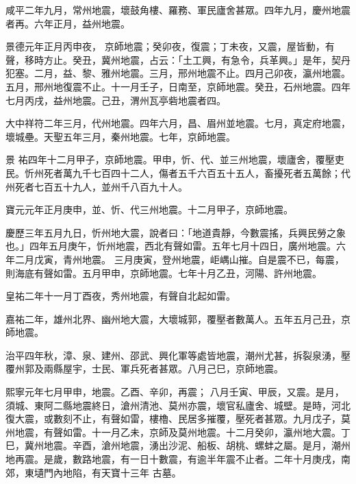 \begin{pinyinscope}
 咸平二年九月，常州地震，壞鼓角樓、羅務、軍民廬舍甚眾。四年九月，慶州地震者再。六年正月，益州地震。



 景德元年正月丙申夜，
 京師地震；癸卯夜，復震；丁未夜，又震，屋皆動，有聲，移時方止。癸丑，冀州地震，占云：「土工興，有急令，兵革興。」是年，契丹犯塞。二月，益、黎、雅州地震。三月，邢州地震不止。四月己卯夜，瀛州地震。五月，邢州地復震不止。十一月壬子，日南至，京師地震。癸丑，石州地震。四年七月丙戌，益州地震。己丑，渭州瓦亭砦地震者四。



 大中祥符二年三月，代州地震。四年六月，昌、眉州並地震。七月，真定府地震，壞城壘。天聖五年三月，秦州地震。七年，京師地震。



 景
 祐四年十二月甲子，京師地震。甲申，忻、代、並三州地震，壞廬舍，覆壓吏民。忻州死者萬九千七百四十二人，傷者五千六百五十五人，畜擾死者五萬餘；代州死者七百五十九人，並州千八百九十人。



 寶元元年正月庚申，並、忻、代三州地震。十二月甲子，京師地震。



 慶歷三年五月九日，忻州地大震，說者曰：「地道貴靜，今數震搖，兵興民勞之象也。」四年五月庚午，忻州地震，西北有聲如雷。五年七月十四日，廣州地震。六年二月戊寅，青州地震。
 三月庚寅，登州地震，岠嵎山摧。自是震不已，每震，則海底有聲如雷。五月甲申，京師地震。七年十月乙丑，河陽、許州地震。



 皇祐二年十一月丁酉夜，秀州地震，有聲自北起如雷。



 嘉祐二年，雄州北界、幽州地大震，大壞城郭，覆壓者數萬人。五年五月己丑，京師地震。



 治平四年秋，漳、泉、建州、邵武、興化軍等處皆地震，潮州尤甚，拆裂泉湧，壓覆州郭及兩縣屋宇，士民、軍兵死者甚眾。八月己巳，京師地震。



 熙寧元年七月甲申，地震。乙酉、辛卯，再震；
 八月壬寅、甲辰，又震。是月，須城、東阿二縣地震終日，滄州清池、莫州亦震，壞官私廬舍、城壁。是時，河北復大震，或數刻不止，有聲如雷，樓櫓、民居多摧覆，壓死者甚眾。九月戊子，莫州地震，有聲如雷。十一月乙未，京師及莫州地震。十二月癸卯，瀛州地大震。丁巳，冀州地震。辛酉，滄州地震，湧出沙泥、船板、胡桃、螺蚌之屬。是月，潮州地再震。是歲，數路地震，有一日十數震，有逾半年震不止者。二年十月庚戌，南郊，東壝門內地陷，有天寶十三年
 古墓。




\end{pinyinscope}
